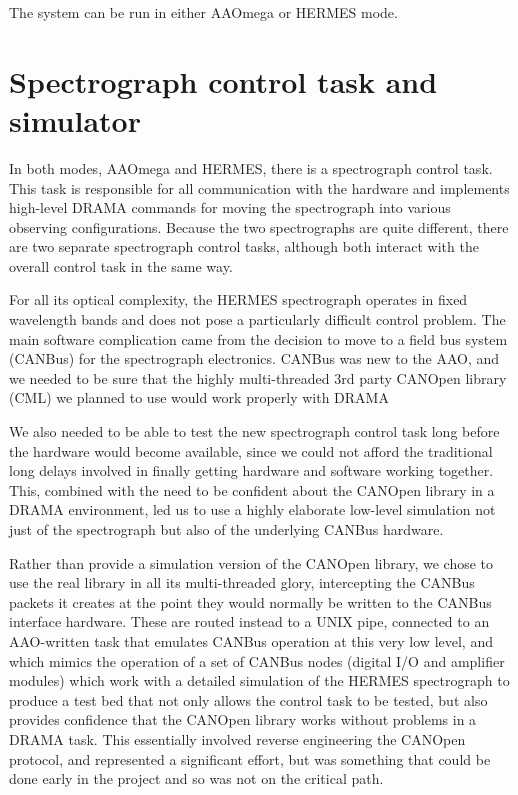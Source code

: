 \documentclass[11pt,twoside]{article}
\begin{document}
The system can be run in either AAOmega or HERMES mode.

\section{Spectrograph control task and simulator}

In both modes, AAOmega and HERMES, there is a spectrograph control task. This task is responsible for all communication with the hardware and implements high-level DRAMA commands for moving the spectrograph into various observing configurations. Because the two spectrographs are quite different, there are two separate spectrograph control tasks, although both interact with the overall control task in the same way.

For all its optical complexity, the HERMES spectrograph operates in fixed wavelength bands and does not pose a particularly difficult control problem. The main software complication came from the decision to move to a field bus system (CANBus) for the spectrograph electronics. CANBus was new to the AAO, and we needed to be sure that the highly multi-threaded 3rd party CANOpen library (CML) we planned to use would work properly with DRAMA

We also needed to be able to test the new spectrograph control task long before the hardware would become available, since we could not afford the traditional long delays involved in finally getting hardware and software working together. This, combined with the need to be confident about the CANOpen library in a DRAMA environment, led us to use a highly elaborate low-level simulation not just of the spectrograph but also of the underlying CANBus hardware.

Rather than provide a simulation version of the CANOpen library, we chose to use the real library in all its multi-threaded glory, intercepting the CANBus packets it creates at the point they would normally be written to the CANBus interface hardware. These are routed instead to a UNIX pipe, connected to an AAO-written task that emulates CANBus operation at this very low level, and which mimics the operation of a set of CANBus nodes (digital I/O and amplifier modules) which work with a detailed simulation of the HERMES spectrograph to produce a test bed that not only allows the control task to be tested, but also provides confidence that the CANOpen library works without problems in a DRAMA task. This essentially involved reverse engineering the CANOpen protocol, and represented a significant effort, but was something that could be done early in the project and so was not on the critical path.
\end{document}
